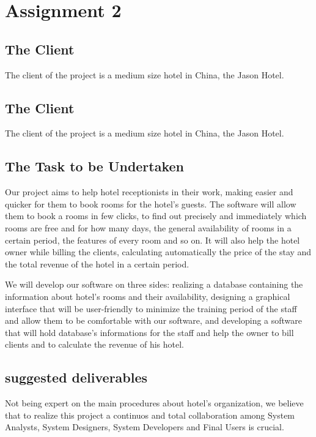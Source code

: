 
\section{Assignment 2}

\subsection{The Client}
The client of the project is a medium size hotel in China, the Jason Hotel.

\subsection{The Client}
The client of the project is a medium size hotel in China, the Jason Hotel.

\subsection{The Task to be Undertaken}
Our project aims to help hotel receptionists in their work, making easier and quicker for them to book rooms for the hotel's guests. The software will allow them to book a rooms in few clicks, to find out precisely and immediately which rooms are free and for how many days, the general availability of rooms in a certain period, the features of every room and so on. It will also help the hotel owner while billing the clients, calculating automatically the price of the stay and the total revenue of the hotel in a certain period.

We will develop our software on three sides: realizing a database containing the information about hotel's rooms and their availability, designing a graphical interface that will be user-friendly to minimize the training period of the staff and allow them to be comfortable with our software, and developing a software that will hold database's informations for the staff and help the owner to bill clients and to calculate the revenue of his hotel.




\subsection{suggested deliverables}
Not being expert on the main procedures about hotel’s organization, we believe that to realize this project a continuos and total collaboration among System Analysts, System Designers, System Developers and Final Users is crucial.


